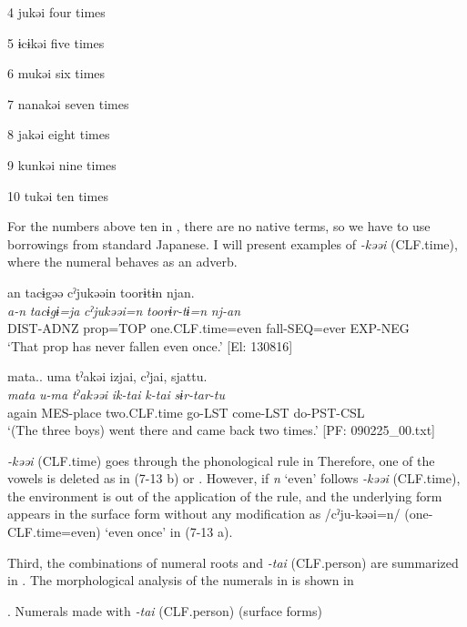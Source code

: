 4  jukəi  four times

5  ɨcɨkəi  five times

6  mukəi  six times

7  nanakəi  seven times

8  jakəi  eight times

9  kunkəi  nine times

10  tukəi  ten times

For the numbers above ten in , there are no native terms, so we have to use borrowings from standard Japanese. I will present examples of \textit{{}-kəəi} (CLF.time), where the numeral behaves as an adverb.

\ea \label{ex:7:13}
\ea \label{ex:7:13a}%
\glll  an  tacɨgəə  cˀjukəəin  toorɨtɨn  njan.\\
\textit{a-n}  \textit{tacɨgɨ=ja}  \textit{cˀjukəəi=n}  \textit{toorɨr-tɨ=n}  \textit{nj{}-an}\\
DIST-ADNZ  prop=TOP  one.CLF.time=even  fall-SEQ=ever  EXP-NEG\\
\glt ‘That prop has never fallen even once.’ [El: 130816]

\ex \label{ex:7:13b}%
\glll  mata..  uma  tˀakəi  izjai,  cˀjai,  sjattu.\\
\textit{mata}  \textit{u-ma}  \textit{tˀakəəi}  \textit{ik-tai}  \textit{k-tai}  \textit{sɨr-tar-tu}\\
again  MES-place  two.CLF.time  go-LST  come-LST  do-PST-CSL\\
\glt ‘(The three boys) went there and came back two times.’ [PF: 090225\_00.txt]
\z
\z

\textit{{}-kəəi} (CLF.time) goes through the phonological rule in  Therefore, one of the vowels is deleted as in (7-13 b) or . However, if \textit{n} ‘even’ follows \textit{{}-kəəi} (CLF.time), the environment is out of the application of the rule, and the underlying form appears in the surface form without any modification as /cˀju-kəəi=n/ (one-CLF.time=even) ‘even once’ in (7-13 a).

Third, the combinations of numeral roots and \textit{{}-tai} (CLF.person) are summarized in . The morphological analysis of the numerals in  is shown in 

\begin{styleBeschriftung}
\textmd{}\textmd{. Numerals made with}\textmd{ \textit{-tai} }\textmd{(CLF.person) (surface forms)}
\end{styleBeschriftung}

